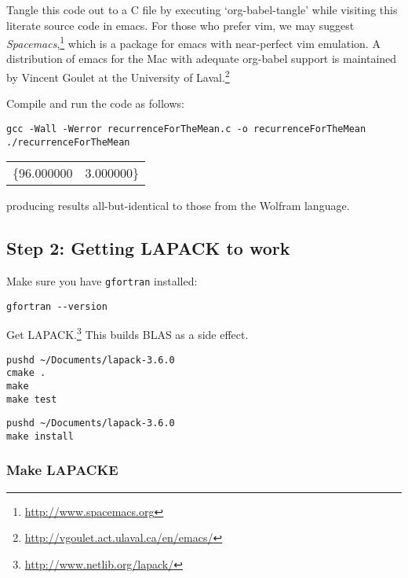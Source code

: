 \documentclass[10pt,oneside,x11names]{article}
\begin{document}
\noindent Tangle this code out to a C file by executing `org-babel-tangle' while
visiting this literate source code in emacs. For those who prefer vim, we may
suggest \emph{Spacemacs},\footnote{\url{http://www.spacemacs.org}} which is a package for emacs with near-perfect vim
emulation. A distribution of emacs for the Mac with adequate org-babel support is maintained
by Vincent Goulet at the University of Laval.\footnote{\url{http://vgoulet.act.ulaval.ca/en/emacs/}}

Compile and run the code as follows:

\begin{verbatim}
gcc -Wall -Werror recurrenceForTheMean.c -o recurrenceForTheMean
./recurrenceForTheMean
\end{verbatim}

\begin{center}
\begin{tabular}{ll}
\{96.000000 & 3.000000\}\\
\end{tabular}
\end{center}

\noindent producing results all-but-identical to those from the Wolfram language.

\subsection{Step 2: Getting LAPACK to work}
\label{sec:orgheadline9}

Make sure you have \texttt{gfortran} installed:

\begin{verbatim}
gfortran --version
\end{verbatim}

Get LAPACK.\footnote{\url{http://www.netlib.org/lapack/}}
This builds BLAS as a side effect.

\begin{verbatim}
pushd ~/Documents/lapack-3.6.0
cmake .
make
make test
\end{verbatim}

\begin{verbatim}
pushd ~/Documents/lapack-3.6.0
make install
\end{verbatim}

\subsubsection{Make LAPACKE}
\label{sec:orgheadline8}
\end{document}
